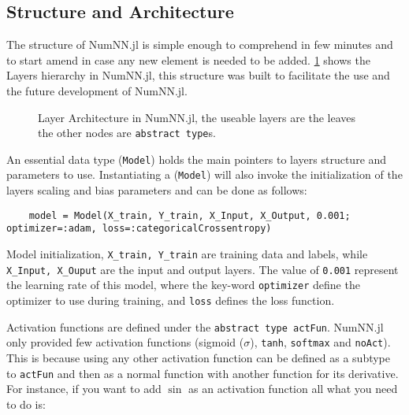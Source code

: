 
\subsection{Structure and Architecture}

The structure of NumNN.jl is simple enough to comprehend in few minutes and to start amend in case any new element is needed to be added. \figurename\ref{fig:layerstruct} shows the Layers hierarchy in NumNN.jl, this structure was built to facilitate the use and the future development of NumNN.jl.

\begin{figure}[!ht]
	\centering
		
	\caption{Layer Architecture in NumNN.jl, the useable layers are the leaves the other nodes are \texttt{abstract type}s.}\label{fig:layerstruct}
\end{figure}

An essential data type (\texttt{Model}) holds the main pointers to layers structure and parameters to use. Instantiating a (\texttt{Model}) will also invoke the initialization of the layers scaling and bias parameters and can be done as follows:

\begin{listing}[H]
	\begin{verbatim}
	model = Model(X_train, Y_train, X_Input, X_Output, 0.001; optimizer=:adam, loss=:categoricalCrossentropy)
	\end{verbatim}
	\caption{Model initialization, \texttt{X_train, Y_train} are training data and labels, while \texttt{X_Input, X_Ouput} are the input and output layers. The value of \texttt{0.001} represent the learning rate of this model, where the key-word \texttt{optimizer} define the optimizer to use during training, and \texttt{loss} defines the loss function.}\label{modelinit}
\end{listing}

Activation functions are defined under the \texttt{abstract type actFun}. NumNN.jl only provided few activation functions (sigmoid ($\sigma$), \texttt{tanh}, \texttt{softmax} and \texttt{noAct}). This is because using any other activation function can be defined as a subtype to \texttt{actFun} and then as a normal function with another function for its derivative. For instance, if you want to add $\sin$ as an activation function all what you need to do is:

